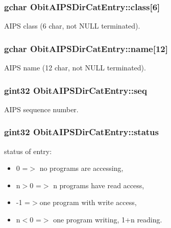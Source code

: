 \subsubsection{\setlength{\rightskip}{0pt plus 5cm}gchar {\bf Obit\-AIPSDir\-Cat\-Entry::class}[6]}\label{structObitAIPSDirCatEntry_o5}


AIPS class (6 char, not NULL terminated). 

\subsubsection{\setlength{\rightskip}{0pt plus 5cm}gchar {\bf Obit\-AIPSDir\-Cat\-Entry::name}[12]}\label{structObitAIPSDirCatEntry_o4}


AIPS name (12 char, not NULL terminated). 

\subsubsection{\setlength{\rightskip}{0pt plus 5cm}gint32 {\bf Obit\-AIPSDir\-Cat\-Entry::seq}}\label{structObitAIPSDirCatEntry_o3}


AIPS sequence number. 

\subsubsection{\setlength{\rightskip}{0pt plus 5cm}gint32 {\bf Obit\-AIPSDir\-Cat\-Entry::status}}\label{structObitAIPSDirCatEntry_o1}


status of entry: \begin{itemize}
\item 0 =$>$ no programs are accessing, \item n$>$0 =$>$ n programs have read access, \item -1 =$>$one program with write access, \item n$<$0 =$>$ one program writing, 1+n reading. \end{itemize}


